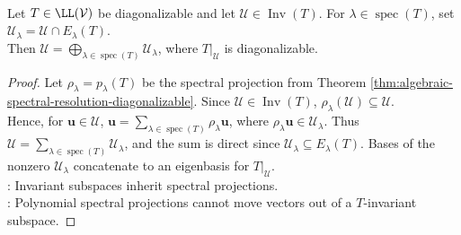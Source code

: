\begin{lemma} \label{lem:diagonalizable-restriction-to-invariant-subspace} \\
Let $T\in\LL(\mathcal{V})$ be diagonalizable and let $\mathcal{U}\in\operatorname{Inv}(T)$. For $\lambda\in\operatorname{spec}(T)$, set $\mathcal{U}_{\lambda}=\mathcal{U}\cap E_{\lambda}(T)$.\\
Then $\mathcal{U}=\bigoplus\limits_{\lambda\in\operatorname{spec}(T)}\mathcal{U}_{\lambda}$, where $T|_{\mathcal{U}}$ is diagonalizable.
\begin{proof}
Let $\rho_{\lambda}=p_{\lambda}(T)$ be the spectral projection from Theorem \ref{thm:algebraic-spectral-resolution-diagonalizable}. Since $\mathcal{U}\in\operatorname{Inv}(T)$, $\rho_{\lambda}(\mathcal{U})\subseteq\mathcal{U}$.\\
Hence, for $\mathbf{u}\in\mathcal{U}$, $\mathbf{u}=\sum\limits_{\lambda\in\operatorname{spec}(T)}\rho_{\lambda}\mathbf{u}$, where $\rho_{\lambda}\mathbf{u}\in\mathcal{U}_{\lambda}$. Thus $\mathcal{U}=\sum\limits_{\lambda\in\operatorname{spec}(T)}\mathcal{U}_{\lambda}$, and the sum is direct since $\mathcal{U}_{\lambda}\subseteq E_{\lambda}(T)$. Bases of the nonzero $\mathcal{U}_{\lambda}$ concatenate to an eigenbasis for $T|_{\mathcal{U}}$.\\
: Invariant subspaces inherit spectral projections.\\
: Polynomial spectral projections cannot move vectors out of a $T$-invariant subspace.
\end{proof}
\end{lemma}

